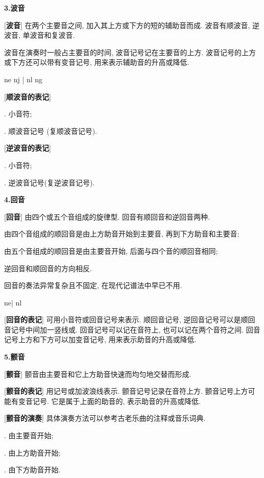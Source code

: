 \clearpage

\begin{center}
 \textbf{3.波音}\\
\end{center}

[\textbf{波音}] 在两个主要音之间, 加入其上方或下方的短的辅助音而成. 波音有顺波音, 逆波音, 单波音和复波音.\par
\qquad 波音在演奏时一般占主要音的时间, 波音记号记在主要音的上方. 波音记号的上方或下方还可以带有变音记号, 用来表示辅助音的升高或降低.\par
\startextract
\Notes \shake n\qa e \Shake n\qa j \en\bar
\Notes \mordent n\qa l \Mordent n\qa g\en
\zendextract

[\textbf{顺波音的表记}] \par
{}. 小音符;\par
{}. 顺波音记号 \quad (复顺波音记号\quad ).\par

[\textbf{逆波音的表记}]\par
{}. 小音符;\par
{}. 逆波音记号\quad (复逆波音记号\quad).\par

\begin{center}
 \textbf{4.回音}\\
\end{center}

[\textbf{回音}] 由四个或五个音组成的旋律型. 回音有顺回音和逆回音两种. \par
\qquad 由四个音组成的顺回音是由上方助音开始到主要音, 再到下方助音和主要音;\par
\qquad 由五个音组成的顺回音是由主要音开始, 后面与四个音的顺回音相同;\par
\qquad 逆回音和顺回音的方向相反.\par
\qquad 回音的奏法异常复杂且不固定, 在现代记谱法中早已不用.\par
\startextract
\Notes \turn n\qa e\en\bar
\Notes \backturn n\qa l\en
\zendextract

[\textbf{回音的表记}] 可用小音符或回音记号来表示. 顺回音记号\quad , 逆回音记号可以是顺回音记号中间加一竖线或\quad. 回音记号可以记在音符上, 也可以记在两个音符之间. 回音记号上方和下方可以加变音记号, 用来表示助音的升高或降低.\par

\clearpage

\begin{center}
 \textbf{5.颤音}\\
\end{center}

[\textbf{颤音}] 颤音由主要音和它上方助音快速而均匀地交替而形成.\par

[\textbf{颤音的表记}] 用记号\quad 或\quad 加波浪线表示. 颤音记号记录在音符上方. 颤音记号上方可能有变音记号. 它是属于上面的助音的, 表示助音的升高或降低.\par

[\textbf{颤音的演奏}] 具体演奏方法可以参考古老乐曲的注释或音乐词典.\par
{}. 由主要音开始;\par
{}. 由上方助音开始;\par
{}. 由下方助音开始.\par


